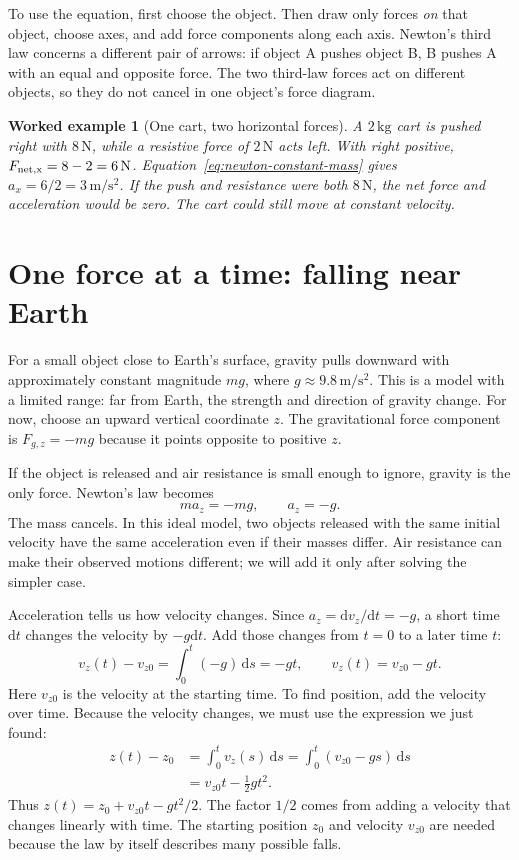 \documentclass[11pt,oneside]{book}
\newcommand{\dd}{\mathrm{d}}
\theoremstyle{reviewstyle}
\newtheorem{example}{Worked example}[chapter]
\begin{document}
To use the equation, first choose the object. Then draw only forces \emph{on} that object, choose axes, and add force components along each axis. Newton's third law concerns a different pair of arrows: if object A pushes object B, B pushes A with an equal and opposite force. The two third-law forces act on different objects, so they do not cancel in one object's force diagram.

\begin{example}[One cart, two horizontal forces]
A $2\,\mathrm{kg}$ cart is pushed right with $8\,\mathrm N$, while a resistive force of $2\,\mathrm N$ acts left. With right positive, $F_{\rm net,x}=8-2=6\,\mathrm N$. Equation~\eqref{eq:newton-constant-mass} gives $a_x=6/2=3\,\mathrm{m/s^2}$. If the push and resistance were both $8\,\mathrm N$, the net force and acceleration would be zero. The cart could still move at constant velocity.
\end{example}

\section{One force at a time: falling near Earth}
For a small object close to Earth's surface, gravity pulls downward with approximately constant magnitude $mg$, where $g\approx9.8\,\mathrm{m/s^2}$. This is a model with a limited range: far from Earth, the strength and direction of gravity change. For now, choose an upward vertical coordinate $z$. The gravitational force component is $F_{g,z}=-mg$ because it points opposite to positive $z$.

If the object is released and air resistance is small enough to ignore, gravity is the only force. Newton's law becomes
\begin{equation}
ma_z=-mg,\qquad a_z=-g.
\end{equation}
The mass cancels. In this ideal model, two objects released with the same initial velocity have the same acceleration even if their masses differ. Air resistance can make their observed motions different; we will add it only after solving the simpler case.

Acceleration tells us how velocity changes. Since $a_z=\dd v_z/\dd t=-g$, a short time $\dd t$ changes the velocity by $-g\dd t$. Add those changes from $t=0$ to a later time $t$:
\begin{equation}
v_z(t)-v_{z0}=\int_0^t(-g)\,\dd s=-gt,
\qquad v_z(t)=v_{z0}-gt.
\end{equation}
Here $v_{z0}$ is the velocity at the starting time. To find position, add the velocity over time. Because the velocity changes, we must use the expression we just found:
\begin{align}
z(t)-z_0
&=\int_0^t v_z(s)\,\dd s
 =\int_0^t(v_{z0}-gs)\,\dd s\\
&=v_{z0}t-\tfrac12gt^2.
\end{align}
Thus $z(t)=z_0+v_{z0}t-gt^2/2$. The factor $1/2$ comes from adding a velocity that changes linearly with time. The starting position $z_0$ and velocity $v_{z0}$ are needed because the law by itself describes many possible falls.
\end{document}
